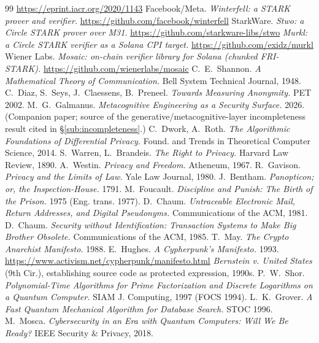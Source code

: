 \documentclass[11pt]{article}
\begin{document}
\begin{thebibliography}{99}
\url{https://eprint.iacr.org/2020/1143}
 Facebook/Meta. \emph{Winterfell: a STARK prover and verifier.}
\url{https://github.com/facebook/winterfell}
 StarkWare. \emph{Stwo: a Circle STARK prover over M31.}
\url{https://github.com/starkware-libs/stwo}
 \emph{Murkl: a Circle STARK verifier as a Solana CPI target.}
\url{https://github.com/exidz/murkl}
 Wiener Labs. \emph{Mosaic: on-chain verifier library for Solana
(chunked FRI-STARK).} \url{https://github.com/wienerlabs/mosaic}
 C.~E.~Shannon. \emph{A Mathematical Theory of Communication.} Bell
System Technical Journal, 1948.
 C.~Diaz, S.~Seys, J.~Claessens, B.~Preneel. \emph{Towards Measuring
Anonymity.} PET 2002.
 M.~G.~Galmanus. \emph{Metacognitive Engineering as a Security
Surface.} 2026. (Companion paper; source of the generative/metacognitive-layer
incompleteness result cited in \S\ref{sub:incompleteness}.)
 C.~Dwork, A.~Roth. \emph{The Algorithmic Foundations of Differential
Privacy.} Found. and Trends in Theoretical Computer Science, 2014.
 S.~Warren, L.~Brandeis. \emph{The Right to Privacy.} Harvard Law
Review, 1890.
 A.~Westin. \emph{Privacy and Freedom.} Atheneum, 1967.
 R.~Gavison. \emph{Privacy and the Limits of Law.} Yale Law Journal,
1980.
 J.~Bentham. \emph{Panopticon; or, the Inspection-House.} 1791.
 M.~Foucault. \emph{Discipline and Punish: The Birth of the Prison.}
1975 (Eng. trans. 1977).
 D.~Chaum. \emph{Untraceable Electronic Mail, Return Addresses, and
Digital Pseudonyms.} Communications of the ACM, 1981.
 D.~Chaum. \emph{Security without Identification: Transaction Systems to
Make Big Brother Obsolete.} Communications of the ACM, 1985.
 T.~May. \emph{The Crypto Anarchist Manifesto.} 1988.
 E.~Hughes. \emph{A Cypherpunk's Manifesto.} 1993.
\url{https://www.activism.net/cypherpunk/manifesto.html}
 \emph{Bernstein v. United States} (9th Cir.), establishing source
code as protected expression, 1990s.
 P.~W.~Shor. \emph{Polynomial-Time Algorithms for Prime Factorization and
Discrete Logarithms on a Quantum Computer.} SIAM J. Computing, 1997 (FOCS 1994).
 L.~K.~Grover. \emph{A Fast Quantum Mechanical Algorithm for Database
Search.} STOC 1996.
 M.~Mosca. \emph{Cybersecurity in an Era with Quantum Computers: Will We
Be Ready?} IEEE Security \& Privacy, 2018.

\end{thebibliography}
\end{document}
